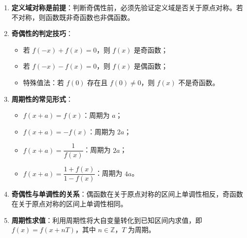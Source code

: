 \documentclass[11pt]{ctexrep}
\begin{document}
\begin{enumerate}
    \item \textbf{定义域对称是前提}：判断奇偶性前，必须先验证定义域是否关于原点对称。若不对称，则函数既非奇函数也非偶函数。
    \item \textbf{奇偶性的判定技巧}：
    \begin{itemize}
        \item 若 $f(-x) + f(x) = 0$，则 $f(x)$ 是奇函数；
        \item 若 $f(-x) - f(x) = 0$，则 $f(x)$ 是偶函数；
        \item 特殊值法：若 $f(0)$ 存在且 $f(0) \neq 0$，则 $f(x)$ 不是奇函数。
    \end{itemize}
    \item \textbf{周期性的常见形式}：
    \begin{itemize}
        \item $f(x+a) = f(x)$：周期为 $a$；
        \item $f(x+a) = -f(x)$：周期为 $2a$；
        \item $f(x+a) = \dfrac{1}{f(x)}$：周期为 $2a$；
        \item $f(x+a) = \dfrac{1+f(x)}{1-f(x)}$：周期为 $4a$。
    \end{itemize}
    \item \textbf{奇偶性与单调性的关系}：偶函数在关于原点对称的区间上单调性相反，奇函数在关于原点对称的区间上单调性相同。
    \item \textbf{周期性求值}：利用周期性将大自变量转化到已知区间内求值，即 $f(x) = f(x + nT)$，其中 $n \in \mathbb{Z}$，$T$ 为周期。
\end{enumerate}
\end{document}
